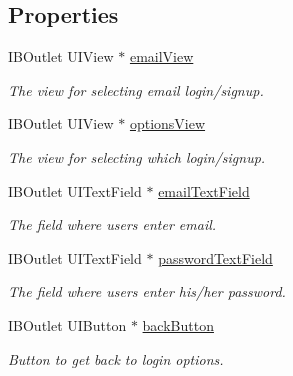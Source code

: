 \subsection*{Properties}
\begin{DoxyCompactItemize}
\item 
\hypertarget{interface_login_sign_up_a797d5135d8e0f5c3764e6c8e863628e8}{I\+B\+Outlet U\+I\+View $\ast$ \hyperlink{interface_login_sign_up_a797d5135d8e0f5c3764e6c8e863628e8}{email\+View}}\label{interface_login_sign_up_a797d5135d8e0f5c3764e6c8e863628e8}

\begin{DoxyCompactList}\small\item\em The view for selecting email login/signup. \end{DoxyCompactList}\item 
\hypertarget{interface_login_sign_up_a9e3a9ddb0ec8c4770478e8e96691aa70}{I\+B\+Outlet U\+I\+View $\ast$ \hyperlink{interface_login_sign_up_a9e3a9ddb0ec8c4770478e8e96691aa70}{options\+View}}\label{interface_login_sign_up_a9e3a9ddb0ec8c4770478e8e96691aa70}

\begin{DoxyCompactList}\small\item\em The view for selecting which login/signup. \end{DoxyCompactList}\item 
\hypertarget{interface_login_sign_up_aef2c833e97693b442b9bf988f7809826}{I\+B\+Outlet U\+I\+Text\+Field $\ast$ \hyperlink{interface_login_sign_up_aef2c833e97693b442b9bf988f7809826}{email\+Text\+Field}}\label{interface_login_sign_up_aef2c833e97693b442b9bf988f7809826}

\begin{DoxyCompactList}\small\item\em The field where users enter email. \end{DoxyCompactList}\item 
\hypertarget{interface_login_sign_up_aad42d499881b619e94e5bbab8b20ce40}{I\+B\+Outlet U\+I\+Text\+Field $\ast$ \hyperlink{interface_login_sign_up_aad42d499881b619e94e5bbab8b20ce40}{password\+Text\+Field}}\label{interface_login_sign_up_aad42d499881b619e94e5bbab8b20ce40}

\begin{DoxyCompactList}\small\item\em The field where users enter his/her password. \end{DoxyCompactList}\item 
\hypertarget{interface_login_sign_up_aa4e657852b263fff100a246b21fc2606}{I\+B\+Outlet U\+I\+Button $\ast$ \hyperlink{interface_login_sign_up_aa4e657852b263fff100a246b21fc2606}{back\+Button}}\label{interface_login_sign_up_aa4e657852b263fff100a246b21fc2606}

\begin{DoxyCompactList}\small\item\em Button to get back to login options. \end{DoxyCompactList}\end{DoxyCompactItemize}


